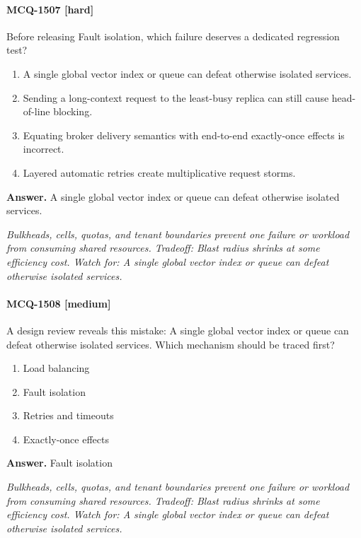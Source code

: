 \paragraph{MCQ-1507 [hard]} Before releasing Fault isolation, which failure deserves a dedicated regression test?
\begin{enumerate}[label=\Alph*.]
\item A single global vector index or queue can defeat otherwise isolated services.
\item Sending a long-context request to the least-busy replica can still cause head-of-line blocking.
\item Equating broker delivery semantics with end-to-end exactly-once effects is incorrect.
\item Layered automatic retries create multiplicative request storms.
\end{enumerate}
\noindent\textbf{Answer.} A single global vector index or queue can defeat otherwise isolated services.
\par\textit{Bulkheads, cells, quotas, and tenant boundaries prevent one failure or workload from consuming shared resources. Tradeoff: Blast radius shrinks at some efficiency cost. Watch for: A single global vector index or queue can defeat otherwise isolated services.}
\paragraph{MCQ-1508 [medium]} A design review reveals this mistake: A single global vector index or queue can defeat otherwise isolated services. Which mechanism should be traced first?
\begin{enumerate}[label=\Alph*.]
\item Load balancing
\item Fault isolation
\item Retries and timeouts
\item Exactly-once effects
\end{enumerate}
\noindent\textbf{Answer.} Fault isolation
\par\textit{Bulkheads, cells, quotas, and tenant boundaries prevent one failure or workload from consuming shared resources. Tradeoff: Blast radius shrinks at some efficiency cost. Watch for: A single global vector index or queue can defeat otherwise isolated services.}
